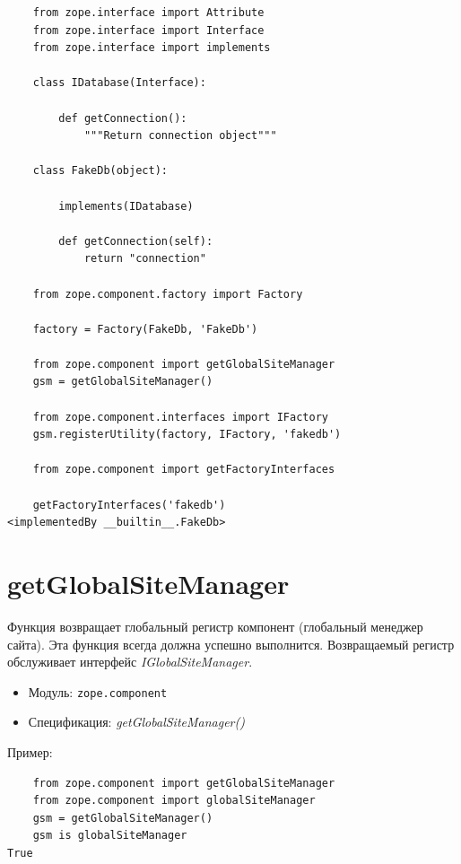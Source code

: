 \documentclass[a4paper,openany,twoside,final]{book}
\providecommand*{\DUroletitlereference}[1]{\textsl{#1}}
\begin{document}
\begin{verbatim}
    from zope.interface import Attribute
    from zope.interface import Interface
    from zope.interface import implements

    class IDatabase(Interface):

        def getConnection():
            """Return connection object"""

    class FakeDb(object):

        implements(IDatabase)

        def getConnection(self):
            return "connection"

    from zope.component.factory import Factory

    factory = Factory(FakeDb, 'FakeDb')

    from zope.component import getGlobalSiteManager
    gsm = getGlobalSiteManager()

    from zope.component.interfaces import IFactory
    gsm.registerUtility(factory, IFactory, 'fakedb')

    from zope.component import getFactoryInterfaces

    getFactoryInterfaces('fakedb')
<implementedBy __builtin__.FakeDb>
\end{verbatim}


\section*{getGlobalSiteManager%
  \label{getglobalsitemanager}%
}

Функция возвращает глобальный регистр компонент (глобальный менеджер сайта).  Эта функция всегда должна успешно выполнится.  Возвращаемый регистр обслуживает интерфейс \DUroletitlereference{IGlobalSiteManager}.

\begin{itemize}

\item Модуль: \texttt{zope.component}

\item Спецификация: \DUroletitlereference{getGlobalSiteManager()}

\end{itemize}

Пример:

\begin{verbatim}
    from zope.component import getGlobalSiteManager
    from zope.component import globalSiteManager
    gsm = getGlobalSiteManager()
    gsm is globalSiteManager
True
\end{verbatim}
\end{document}
